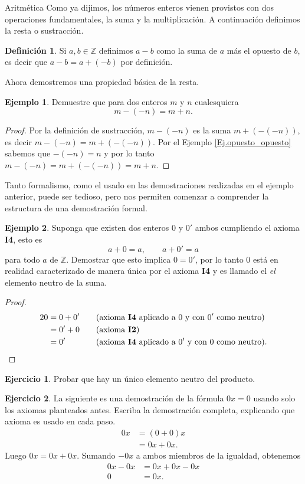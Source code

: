 \documentclass[11pt,spanish,makeidx]{amsbook}
\theoremstyle{definition}
\newtheorem{definicion}{Definici\'on}[section]
\newtheorem{ejemplo}{Ejemplo}[section]
\newtheorem{ejercicio}{Ejercicio}[section]
\theoremstyle{remark}
\begin{document}
\begin{section}{Aritmética}
Como ya dijimos, los números enteros vienen provistos con dos operaciones fundamentales, la suma y la multiplicación. A continuación definimos la resta o sustracción. 

\begin{definicion} Si $a,b\in\mathbb{Z}$ definimos $a-b$ como la suma de $a$ más el opuesto de $b$, es decir que  $a-b=a+(-b)$ por definición. 
\end{definicion}

Ahora demostremos una propiedad básica de la resta.

\begin{ejemplo} Demuestre que para dos enteros $m$ y $n$ cualesquiera
$$m-(-n) = m+n.$$ 
\end{ejemplo}
\begin{proof} Por la definición de sustracción, $m-(-n)$ es la suma $m+(-(-n))$, es decir  $m-(-n)=m+(-(-n))$.  Por el Ejemplo \ref{Ej.opuesto_opuesto} sabemos que $-(-n)=n$ y por lo tanto $m-(-n)=m+(-(-n))=m+n$.
\end{proof}

Tanto formalismo, como el usado en las demostraciones realizadas en el ejemplo anterior, puede ser tedioso, pero nos permiten comenzar a comprender la estructura de una demostración formal. 

\begin{ejemplo} Suponga que existen dos enteros $0$ y $0'$ ambos cumpliendo el
 axioma {\bf I4}, esto es
$$
a+0= a, \qquad a+0'=a
$$
para todo $a$ de $\mathbb Z$. Demostrar que esto implica $0=0'$, por lo tanto 0 está en realidad caracterizado de manera única por el axioma {\bf I4} y es llamado el {\em el} elemento neutro de la suma.
\end{ejemplo}
\begin{proof}
\begin{alignat*}2
0 &= 0 + 0'& &\text{(axioma {\bf I4} aplicado a $0$ y con $0'$ como neutro)} \\
&=0'+0&\quad &\text{(axioma {\bf I2})}\\
&= 0' & &\text{(axioma {\bf I4} aplicado a $0'$ y con $0$ como neutro)}.
\end{alignat*}
\end{proof}

\begin{ejercicio} Probar que hay un único elemento neutro del producto.
\end{ejercicio}

\begin{ejercicio} \label{ej0a}
La siguiente es una demostración de la fórmula $0x=0$ usando solo los axiomas planteados antes. Escriba la demostración completa, explicando que axioma es usado en cada paso.
$$\begin{aligned}
0x &= (0+0)x \\  &=0x+0x.
\end{aligned}$$
Luego $0x =0x+0x$. Sumando $-0x$ a ambos miembros de la igualdad, obtenemos 
$$\begin{aligned}
0x -0x &= 0x+0x -0x\\  0 &=0x.
\end{aligned}$$


\end{ejercicio}
\end{section}
\end{document}
